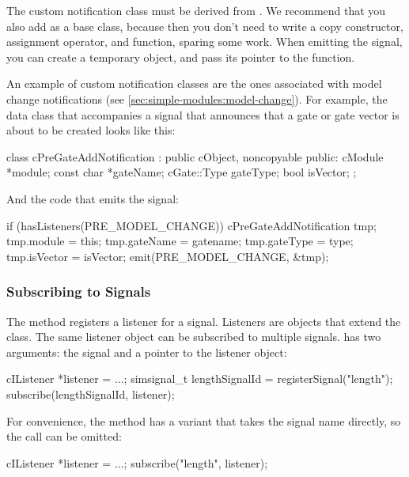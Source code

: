 \begin{ned}
The custom notification class must be derived from .
We recommend that you also add  as a base class, because
then you don't need to write a copy constructor, assignment operator, and
 function, sparing some work. When emitting the signal, you
can create a temporary object, and pass its pointer to the 
function.

An example of custom notification classes are the ones associated with
model change notifications (see \ref{sec:simple-modules:model-change}).
For example, the data class that accompanies a signal that announces that a
gate or gate vector is about to be created looks like this:

\begin{cpp}
class cPreGateAddNotification : public cObject, noncopyable
{
  public:
    cModule *module;
    const char *gateName;
    cGate::Type gateType;
    bool isVector;
};
\end{cpp}

And the code that emits the signal:

\begin{cpp}
if (hasListeners(PRE_MODEL_CHANGE))
{
    cPreGateAddNotification tmp;
    tmp.module = this;
    tmp.gateName = gatename;
    tmp.gateType = type;
    tmp.isVector = isVector;
    emit(PRE_MODEL_CHANGE, &tmp);
}
\end{cpp}


\subsubsection{Subscribing to Signals}
\label{sec:simple-modules:subscribing-to-signals}

The  method registers a listener for a signal.
Listeners are objects that extend the  class.
The same listener object can be subscribed to multiple signals.
 has two arguments: the signal and a pointer to
the listener object:

\begin{cpp}
cIListener *listener = ...;
simsignal_t lengthSignalId = registerSignal("length");
subscribe(lengthSignalId, listener);
\end{cpp}

For convenience, the  method has a variant
that takes the signal name directly, so the 
call can be omitted:

\begin{cpp}
cIListener *listener = ...;
subscribe("length", listener);
\end{cpp}


\end{ned}
